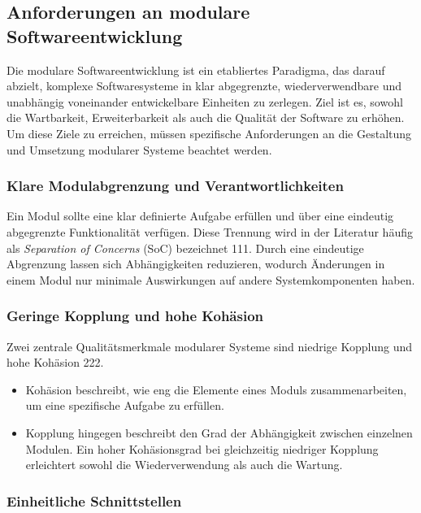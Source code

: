 \subsection{Anforderungen an modulare Softwareentwicklung}

Die modulare Softwareentwicklung ist ein etabliertes Paradigma, das darauf abzielt, komplexe Softwaresysteme in klar abgegrenzte, wiederverwendbare und unabhängig voneinander entwickelbare Einheiten zu zerlegen.
Ziel ist es, sowohl die Wartbarkeit, Erweiterbarkeit als auch die Qualität der Software zu erhöhen.
Um diese Ziele zu erreichen, müssen spezifische Anforderungen an die Gestaltung und Umsetzung modularer Systeme beachtet werden.


\subsubsection{Klare Modulabgrenzung und Verantwortlichkeiten}

Ein Modul sollte eine klar definierte Aufgabe erfüllen und über eine eindeutig abgegrenzte Funktionalität verfügen.
Diese Trennung wird in der Literatur häufig als \textit{Separation of Concerns} (SoC) bezeichnet 111.
Durch eine eindeutige Abgrenzung lassen sich Abhängigkeiten reduzieren, wodurch Änderungen in einem Modul nur minimale Auswirkungen auf andere Systemkomponenten haben.


\subsubsection{Geringe Kopplung und hohe Kohäsion}

Zwei zentrale Qualitätsmerkmale modularer Systeme sind niedrige Kopplung und hohe Kohäsion 222.


\begin{itemize}

\item
Kohäsion beschreibt, wie eng die Elemente eines Moduls zusammenarbeiten, um eine spezifische Aufgabe zu erfüllen.
\item
Kopplung hingegen beschreibt den Grad der Abhängigkeit zwischen einzelnen Modulen.
Ein hoher Kohäsionsgrad bei gleichzeitig niedriger Kopplung erleichtert sowohl die Wiederverwendung als auch die Wartung.

\end{itemize}

\subsubsection{Einheitliche Schnittstellen}

